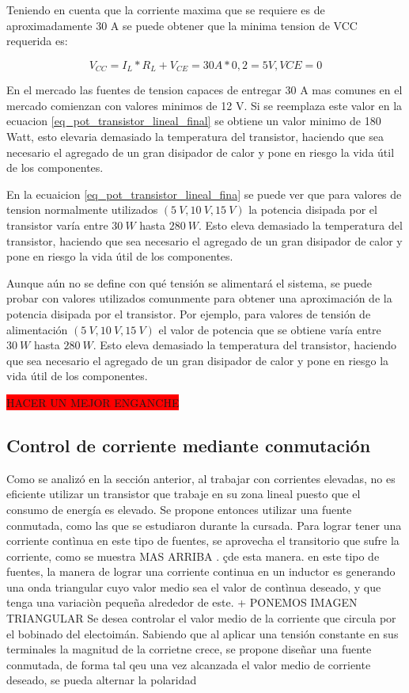 Teniendo en cuenta que la corriente maxima que se requiere es de aproximadamente 30 A se puede obtener que la minima tension de VCC requerida es:

\begin{equation}
	V_{CC}=I_L*R_L+V_{CE}=30 A * 0,2  = 5 V, VCE=0
\end{equation}

En el mercado las fuentes de tension capaces de entregar 30 A mas comunes en el mercado comienzan con valores minimos de 12 V. Si se reemplaza este valor en la ecuacion  \ref{eq_pot_transistor_lineal_final} se obtiene un valor minimo de 180 Watt, esto elevaria demasiado la temperatura del transistor, haciendo que sea necesario el agregado de un gran disipador de calor y pone en riesgo la vida útil de los componentes.
  
En la ecuaicion \ref{eq_pot_transistor_lineal_fina} se puede ver que para valores de tension normalmente utilizados $(5\:V,10\:V,15\:V)$ la potencia disipada por el transistor varía entre $30\:W$ hasta $280\:W$. Esto eleva demasiado la temperatura del transistor, haciendo que sea necesario el agregado de un gran disipador de calor y pone en riesgo la vida útil de los componentes.

Aunque aún no se define con qué tensión se alimentará el sistema, se puede probar con valores utilizados comunmente para obtener una aproximación de la potencia disipada por el transistor. Por ejemplo, para valores de tensión de alimentación $(5\:V,10\:V,15\:V)$ el valor de potencia que se obtiene varía entre $30\:W$ hasta $280\:W$. Esto eleva demasiado la temperatura del transistor, haciendo que sea necesario el agregado de un gran disipador de calor y pone en riesgo la vida útil de los componentes.

\colorbox{red}{HACER UN MEJOR ENGANCHE}

\subsection{Control de corriente mediante conmutación}

Como se analizó en la sección anterior, al trabajar con corrientes elevadas, no es eficiente utilizar un transistor que trabaje en su zona lineal puesto que el consumo de energía es elevado. Se propone entonces utilizar una fuente conmutada, como las que se estudiaron durante la cursada. Para lograr tener una corriente contìnua en este tipo de fuentes, se aprovecha el transitorio que sufre la corriente, como se muestra 	MAS ARRIBA	 . çde esta manera. 
en este tipo de fuentes, la manera de lograr una corriente continua en un inductor es generando una onda triangular cuyo valor medio sea el valor de contìnua deseado, y que tenga una variaciòn pequeña alrededor de este. 
+
PONEMOS IMAGEN TRIANGULAR
Se desea controlar el valor medio de la corriente que circula por el bobinado del electoimán. Sabiendo que al aplicar una tensión constante en sus terminales la magnitud de la corrietne crece, se propone diseñar una fuente conmutada, de forma tal qeu una vez alcanzada el valor medio de corriente deseado, se pueda alternar la polaridad 

